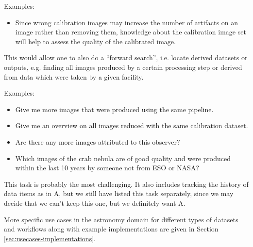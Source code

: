         \noindent Examples:
        \begin{itemize}
            \item Since wrong calibration images may increase the
number of artifacts on an image rather than removing them, knowledge about
the calibration image set will help to assess the quality of the calibrated
image.  
        \end{itemize}
      

        This would allow one to also do a ``forward search'', i.e. locate derived datasets or outputs, e.g. finding all images produced by a certain processing step or derived from data which were taken by a given facility.
        
        \noindent Examples:
        \begin{itemize}
            \item Give me more images that were produced using the
same pipeline.  
            \item Give me an overview on all images reduced with the same calibration dataset.  
            \item Are there any more images attributed to this observer?  
            \item Which images of the crab nebula are of good quality and were produced within the last 10 years by someone not from ESO or NASA?
        \end{itemize}

        This task is probably the most challenging. It also includes tracking the history of data items as in A, but we still have listed this task separately, since we may decide that we can't keep this one, but we definitely want A.

        
More specific use cases in the astronomy domain for different types of datasets and workflows along with example implementations are given in Section \ref{sec:usecases-implementations}.

